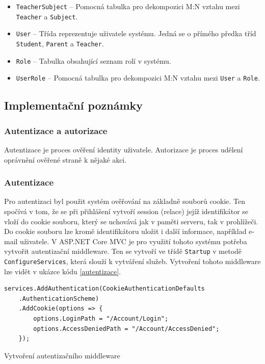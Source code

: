 \begin{itemize}
    \item \texttt{TeacherSubject} -- Pomocná tabulka pro dekompozici M:N vztahu mezi \texttt{Teacher} a \texttt{Subject}.
    \item \texttt{User} -- Třída reprezentuje uživatele systému. Jedná se o přímého předka tříd \texttt{Student}, \texttt{Parent} a \texttt{Teacher}.
    \item \texttt{Role} -- Tabulka obsahující seznam rolí v systému.
    \item \texttt{UserRole} -- Pomocná tabulka pro dekompozici M:N vztahu mezi \texttt{User} a \texttt{Role}.
\end{itemize}

\subsection{Implementační poznámky}
\subsubsection{Autentizace a autorizace}
Autentizace je proces ověření identity uživatele. Autorizace je proces udělení oprávnění ověřené straně k nějaké akci. \cite{autentizace-autorizace}

\subsubsection*{Autentizace}
Pro autentizaci byl použit systém ověřování na základně souborů cookie. Ten spočívá v tom, že se při přihlášení vytvoří session (relace) jejíž identifikátor se vloží do cookie souboru, který se uchovává jak v paměti serveru, tak v prohlížeči. Do cookie souboru lze kromě identifikátoru uložit i další informace, například e-mail uživatele. V ASP.NET Core MVC je pro využití tohoto systému potřeba vytvořit autentizační middleware. Ten se vytvoří ve třídě \texttt{Startup} v metodě \texttt{ConfigureServices}, která slouží k vytváření služeb. Vytvoření tohoto middleware lze vidět v ukázce kódu \ref{autentizace}.
\clearpage
\begin{listing}[h]
    \begin{verbatim}
services.AddAuthentication(CookieAuthenticationDefaults
    .AuthenticationScheme)
    .AddCookie(options => {
        options.LoginPath = "/Account/Login";
        options.AccessDeniedPath = "/Account/AccessDenied";
    });
    \end{verbatim}
    \caption{Vytvoření autentizačního middleware}
    \label{autentizace}
\end{listing}

